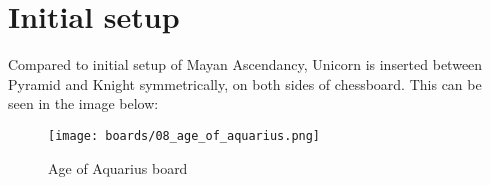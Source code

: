 \section*{Initial setup}

Compared to initial setup of Mayan Ascendancy, Unicorn is inserted between Pyramid and Knight
symmetrically, on both sides of chessboard. This can be seen in the image below:

\noindent
\begin{figure}[h]
\texttt{[image: boards/08\_age\_of\_aquarius.png]}
\caption{Age of Aquarius board}
\label{fig:08_age_of_aquarius}
\end{figure}

\clearpage %
